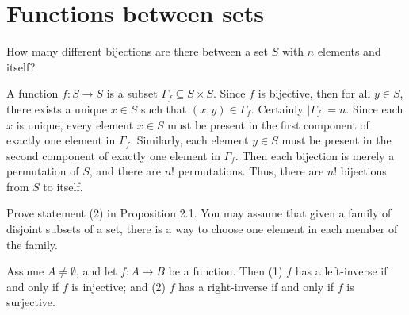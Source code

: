 \documentclass[../../master.tex]{subfiles}
\begin{document}
\section{Functions between sets}

  \begin{problem}
    How many different bijections are there between a set \(S\) with \(n\) elements and itself?
  \end{problem}

  \begin{solution}
    A function \(f: S \to S\) is a subset \(\Gamma_{f} \subseteq S \times S\).
    Since \(f\) is bijective, then for all \(y \in S\), there exists a unique \(x \in S\) such that \((x, y) \in \Gamma_{f}\).
    Certainly \(|\Gamma_{f}| = n\). Since each \(x\) is unique, every element \(x \in S\) must be present in the first component of exactly one element in \(\Gamma_{f}\).
    Similarly, each element \(y \in S\) must be present in the second component of exactly one element in \(\Gamma_{f}\).
    Then each bijection is merely a permutation of \(S\), and there are \(n!\) permutations.
    Thus, there are \(n!\) bijections from \(S\) to itself.
  \end{solution}

  \begin{problem}
    Prove statement (2) in Proposition 2.1. You may assume that given a family of disjoint subsets of a set, there is a way to choose one element in each member of the family.
  \end{problem}

  \begin{proposition}[Proposition 2.1]
    Assume \(A \neq \emptyset \), and let \(f: A \to B\) be a function.
    Then (1) \(f\) has a left-inverse if and only if \(f \) is injective; and (2) \(f\) has a right-inverse if and only if \(f\) is surjective.
  \end{proposition}
\end{document}
